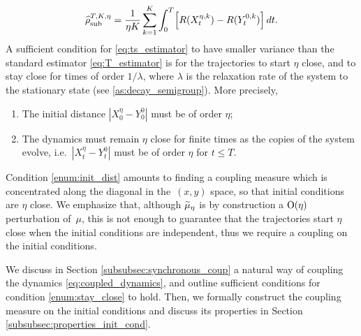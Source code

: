 %
\begin{equation}
    \TSest = \frac{1}{\eta K} \sum_{k=1}^K \int_0^T \bkt*{R(X_t^{\eta,k}) - R(Y_t^{0,k})} \, dt.
    \label{eq:ts_estimator}
\end{equation}
%
A sufficient condition for \eqref{eq:ts_estimator} to have smaller variance than the standard estimator \eqref{eq:T_estimator} is for the trajectories to start $\eta$ close, and to stay close for times of order $1/\lambda$, where $\lambda$ is the relaxation rate of the system to the stationary state (see \cref{as:decay_semigroup}). More precisely,
%

\begin{enumerate}[label={(\Alph*)}]
	\item \label{enum:init_dist} The initial distance $|X_0^\eta - Y_0^0|$ must be of order $\eta$;
	\item \label{enum:stay_close} The dynamics must remain $\eta$ close for finite times as the copies of the system evolve, i.e.\ $|X_t^\eta - Y_t^0|$ must be of order $\eta$ for $t\leq T$.
\end{enumerate}
%
Condition \ref{enum:init_dist} amounts to finding a coupling measure which is concentrated along the diagonal in the~$(x,y)$ space, so that initial conditions are $\eta$ close. We emphasize that, although $\widetilde{\mu}_\eta$ is by construction a $\mathrm{O}(\eta)$ perturbation of~$\mu$, this is not enough to guarantee that the trajectories start $\eta$ close when the initial conditions are independent, thus we require a coupling on the initial conditions.

 We discuss in Section \ref{subsubsec:synchronous_coup} a natural way of coupling the dynamics \eqref{eq:coupled_dynamics}, and outline sufficient conditions for condition \ref{enum:stay_close} to hold. Then, we formally construct the coupling measure on the initial conditions and discuss its properties in Section \ref{subsubsec:properties_init_cond}.
 
